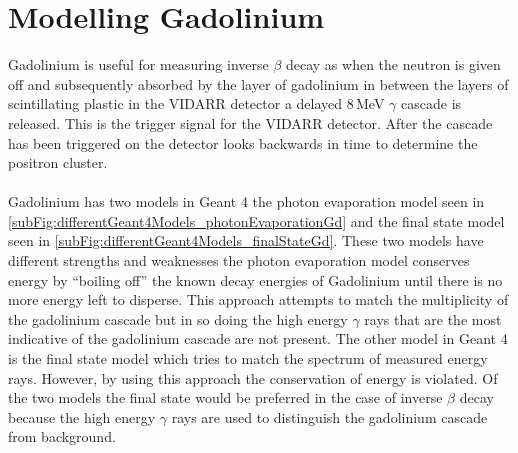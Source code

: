 \section{Modelling Gadolinium}\label{sec:geant4Simulation_modellingGadolinium}
Gadolinium is useful for measuring inverse $\beta$ decay as when the neutron is given off and subsequently absorbed by the layer of gadolinium in between the layers of scintillating plastic in the VIDARR detector a delayed 8\,MeV $\gamma$ cascade is released. This is the trigger signal for the VIDARR detector. After the cascade has been triggered on the detector looks backwards in time to determine the positron cluster. 
\\\\Gadolinium has two models in Geant 4 the photon evaporation model seen in \ref{subFig:differentGeant4Models_photonEvaporationGd} and the final state model seen in  \ref{subFig:differentGeant4Models_finalStateGd}. These two models have different strengths and weaknesses the photon evaporation model conserves energy by ``boiling off'' the known decay energies of Gadolinium until there is no more energy left to disperse. This approach attempts to match the multiplicity of the gadolinium cascade but in so doing the high energy $\gamma$ rays that are the most indicative of the gadolinium cascade are not present. The other model in Geant 4 is the final state model which tries to match the spectrum of measured energy rays. However, by using this approach the conservation of energy is violated. Of the two models the final state would be preferred in the case of inverse $\beta$ decay because the high energy $\gamma$ rays are used to distinguish the gadolinium cascade from background.


